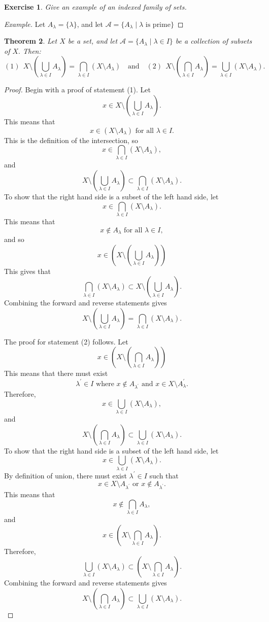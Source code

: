 \documentclass{amsart}
\newtheorem{theorem}{Theorem}
\newtheorem{exercise}[theorem]{Exercise}
\newcommand{\1}{\mathds{1}}
\numberwithin{equation}{section}
\numberwithin{theorem}{section}
\begin{document}
\begin{exercise}
	Give an example of an indexed family of sets.
	
\end{exercise}

\begin{proof}[Example]
	Let $A_\lambda = \{\lambda\}$, and let $\mathcal{A} = \{A_\lambda\mid \lambda \text{ is prime}\}$
\end{proof}

\begin{theorem} 
Let $X$ be a set, and let  $\mathcal{A}=\{A_\lambda\mid \lambda\in I\}$ be a collection of subsets of $X.$ Then:
\[
	(1) \ \ X\setminus \left( \bigcup_{\lambda\in I}A_\lambda\right) =\bigcap_{\lambda\in I} (X\setminus A_\lambda)
	\quad\text{and}\quad
	(2) \ \ X\setminus \left( \bigcap_{\lambda\in I}A_\lambda\right)  =\bigcup_{\lambda\in I} (X\setminus A_\lambda).
\]
\end{theorem}

\begin{proof}
		
		Begin with a proof of statement (1). Let $$x\in X\setminus(\bigcup_{\lambda\in I}A_\lambda).$$ This means that $$x\in (X\setminus A_\lambda)\text{ for all } \lambda\in I.$$ This is the definition of the intersection, so $$x\in \bigcap_{\lambda\in I} (X\setminus A_\lambda),$$ and  $$X\setminus \left( \bigcup_{\lambda\in I}A_\lambda\right)\subset \bigcap_{\lambda\in I} (X\setminus A_\lambda).$$ 
		To show that the right hand side is a subset of the left hand side, let $$x\in \bigcap_{\lambda\in I} (X\setminus A_\lambda).$$ This means that $$x\notin A_\lambda\text{ for all } \lambda\in I,$$ and so $$x\in (X\setminus(\bigcup_{\lambda\in I}A_\lambda))$$ This gives that $$\bigcap_{\lambda\in I} (X\setminus A_\lambda)\subset X\setminus(\bigcup_{\lambda\in I}A_\lambda).$$ Combining the forward and reverse statements gives $$X\setminus \left( \bigcup_{\lambda\in I}A_\lambda\right) =\bigcap_{\lambda\in I} (X\setminus A_\lambda).$$
		
		The proof for statement (2) follows. Let $$x\in (X\setminus(\bigcap_{\lambda\in I}A_\lambda))$$ This means that there must exist $$\lambda^\prime\in I \text{ where } x\notin A_{\lambda^\prime}\text{ and } x\in X\setminus A_\lambda^\prime.$$ Therefore, $$x\in\bigcup_{\lambda\in I}(X\setminus A_\lambda), $$and $$X\setminus(\bigcap_{\lambda\in I}A_\lambda)\subset \bigcup_{\lambda\in I}(X\setminus A_\lambda).$$ 
		To show that the right hand side is a subset of the left hand side, let $$x\in \bigcup_{\lambda\in I}(X\setminus A_\lambda).$$ By definition of union, there must exist $\lambda^\prime\in I$ such that $$x\in X\setminus A_{\lambda^\prime} \text{ or } x\notin A_{\lambda^\prime}.$$ This means that $$x\notin \bigcap_{\lambda\in I}A_\lambda,$$ and $$x\in (X\setminus \bigcap_{\lambda\in I}A_\lambda).$$ Therefore, $$\bigcup_{\lambda\in I}(X\setminus A_\lambda)\subset (X\setminus \bigcap_{\lambda\in I}A_\lambda).$$ Combining the forward and reverse statements gives $$X\setminus(\bigcap_{\lambda\in I}A_\lambda)\subset \bigcup_{\lambda\in I}(X\setminus A_\lambda).$$
\end{proof}
\end{document}
